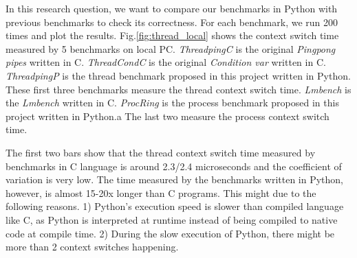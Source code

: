 




In this research question, we want to compare our benchmarks in Python with previous benchmarks to check its correctness. 
For each benchmark, we run 200 times and plot the results.
Fig.\ref{fig:thread_local} shows the context switch time measured by 5 benchmarks on local PC. 
\emph{ThreadpingC} is the original \emph{Pingpong pipes}\cite{cs-pipes,cs-web} written in C.
\emph{ThreadCondC} is the original \emph{Condition var}\cite{cs-web} written in C.
\emph{ThreadpingP} is the thread benchmark proposed in this project written in Python.
These first three benchmarks measure the thread context switch time.
\emph{Lmbench} is the \emph{Lmbench}\cite{cs-lmbench} written in C.
\emph{ProcRing} is the process benchmark proposed in this project written in Python.a
The last two measure the process context switch time. 
 
The first two bars show that the thread context switch time measured by benchmarks in C language is around 2.3/2.4 microseconds and the coefficient of variation is very low. 
The time measured by the benchmarks written in Python, however, is almost 15-20x longer than C programs. 
This might due to the following reasons. 1) Python's execution speed is slower than compiled language like C, as Python is interpreted at runtime instead of being compiled to native code at compile time. 
2) During the slow execution of Python, there might be more than 2 context switches happening.

